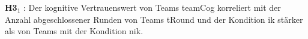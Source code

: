 \documentclass[a4paper,11pt]{article}%
\renewcommand{\\}{\vspace*{0.5\baselineskip} \newline}
\begin{document}
\textbf{H3$_{1}$} : Der kognitive Vertrauenswert von Teams \ac{teamCog} korreliert mit der Anzahl abgeschlossener Runden von Teams \ac{tRound} und der Kondition \ac{ik} stärker als von Teams mit der Kondition \ac{nik}. \\
%
%
%
%
%
%
%
%
%
%
\end{document}
